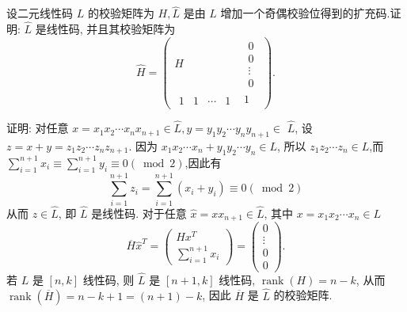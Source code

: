 \begin{exercise}
  设二元线性码 $ L $ 的校验矩阵为 $ H, \widehat{L} $ 是由 $ L $ 增加一个奇偶校验位得到的扩充码.证明: $ \widehat{L} $ 是线性码, 并且其校验矩阵为
$$
\hat{H} = \left(
\begin{array}{c|c}
H & \begin{matrix} 0 \\ 0 \\ \vdots \\ 0 \end{matrix} \\
\hline
\begin{matrix} 1 & 1 & \cdots & 1 \end{matrix} & 1
\end{array}
\right).
$$

\end{exercise}
\begin{solution}
    证明: 对任意 $ x=x_{1} x_{2} \cdots x_{n} x_{n+1} \in \widehat{L}, y=y_{1} y_{2} \cdots y_{n} y_{n+1} \in $ $ \widehat{L} $, 设 $ z=x+y=z_{1} z_{2} \cdots z_{n} z_{n+1} $.
因为 $ x_{1} x_{2} \cdots x_{n}+y_{1} y_{2} \cdots y_{n} \in L $, 所以 $ z_{1} z_{2} \cdots z_{n} \in L $,而 $ \sum\limits_{i=1}^{n+1} x_{i} \equiv \sum\limits_{i=1}^{n+1} y_{i} \equiv 0(\bmod 2) $,因此有
$$
\sum_{i=1}^{n+1} z_{i}=\sum_{i=1}^{n+1}\left(x_{i}+y_{i}\right) \equiv 0(\bmod 2)
$$
从而 $ z \in \widehat{L} $, 即 $ \widehat{L} $ 是线性码.
对于任意 $ \widehat{x}=x x_{n+1} \in \widehat{L} $, 其中 $ x=x_{1} x_{2} \cdots x_{n} \in L $
$$
\overline{H} \widehat{x}^{T}=\left(\begin{array}{c}
H x^{T} \\
\sum\limits_{i=1}^{n+1} x_{i}
\end{array}\right)=\left(\begin{array}{c}
0 \\
\vdots \\
0 \\
0
\end{array}\right) .
$$
若 $ L $ 是 $ [n, k] $ 线性码, 则 $ \widehat{L} $ 是 $ [n+1, k] $ 线性码, $ \operatorname{rank}(H)=n-k $, 从而 $ \operatorname{rank}(\overline{H})=n-k+1=(n+1)-k $, 因此 $ \overline{H} $ 是 $ \widehat{L} $ 的校验矩阵.
\end{solution}


